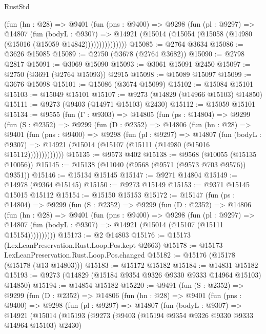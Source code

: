 \begin{lexlean}{RustStd}
\begin{coremodule}
{\begin{coremodule}
{{{{{{{{{{{{{{{{{{{{{{{{{{{{{{{{{{{{{{{{{{{{{{{{{{{{{{{              (fun (hn : @28) =>
              @9401
                (fun (pns : @9400) =>
                @9298
                  (fun (pl : @9297) =>
                  @14807
                    (fun (bodyL : @9307) =>
                    @14921 (@15014 (@15054 (@15058 (@14980 (@15016 (@15059 @14842)))))))))))))))
@15085 := @2764 @3634
@15086 := @3626 @15085
@15089 := @2750 (@3678 (@2764 @3682))
@15090 := @2798 @2817
@15091 := @3069 @15090
@15093 := @3061 @15091 @2450
@15097 := @2750 (@3691 (@2764 @15093)) @2915
@15098 := @15089 @15097
@15099 := @3676 @15098
@15101 := @15086 (@3674 @15099)
@15102 := @15084 @15101
@15103 := @15049 @15101
@15107 := @9273 (@14829 (@14966 @15103) @14850)
@15111 := @9273 (@9403 (@14971 @15103) @2430)
@15112 := @15059 @15101
@15134 := @9555
    (fun (Γ : @9303) =>
    @14805
      (fun (ps : @14804) =>
      @9299
        (fun (S : @2352) =>
        @9299
          (fun (D : @2352) =>
          @14806
            (fun (hn : @28) =>
            @9401
              (fun (pns : @9400) =>
              @9298
                (fun (pl : @9297) =>
                @14807
                  (fun (bodyL : @9307) =>
                  @14921 (@15014 (@15107 (@15111 (@14980 (@15016 @15112)))))))))))))
@15135 := @9573 @402
@15138 := @9568 (@10055 (@15135 @10056))
@15145 := @15138 (@11040 (@9568 (@9571 (@9573 @703 @9576)) @9351))
@15146 := @15134 @15145
@15147 := @9271 @14804
@15149 := @14978 (@9364 @15145)
@15150 := @9273 @15149
@15153 := @9371 @15145 @15015 @15112
@15154 := @15150 @15153
@15172 := @15147
    (fun (ps : @14804) =>
    @9299
      (fun (S : @2352) =>
      @9299
        (fun (D : @2352) =>
        @14806
          (fun (hn : @28) =>
          @9401
            (fun (pns : @9400) =>
            @9298
              (fun (pl : @9297) =>
              @14807 (fun (bodyL : @9307) => @14921 (@15014 (@15107 (@15111 @15154))))))))))
@15173 := @2 @14803
@15176 := @15173 (LexLeanPreservation.Rust.Loop.Pos.kept @2663)
@15178 := @15173 LexLeanPreservation.Rust.Loop.Pos.changed
@15182 := @15176 (@15178 (@15178 (@13 @14803)))
@15183 := @15172 @15182
@15184 := @14831 @15182
@15193 := @9273 (@14829 (@15184 @9354 @9326 @9330 @9333 @14964 @15103) @14850)
@15194 := @14854 @15182
@15220 := @9491
    (fun (S : @2352) =>
    @9299
      (fun (D : @2352) =>
      @14806
        (fun (hn : @28) =>
        @9401
          (fun (pns : @9400) =>
          @9298
            (fun (pl : @9297) =>
            @14807
              (fun (bodyL : @9307) =>
              @14921
                (@15014
                  (@15193
                    (@9273
                      (@9403 (@15194 @9354 @9326 @9330 @9333 @14964 @15103) @2430)
}}}}}}}}}}}}}}}}}}}}}}}}}}}}}}}}}}}}}}}}}}}}}}}}}}}}}}}
\end{coremodule}}
\end{coremodule}
\end{lexlean}
